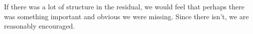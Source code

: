If there was a lot of structure in the residual, we would feel that perhaps there was something important and obvious we were missing.  Since there isn't, we are reasonably encouraged.

% 
% 








































